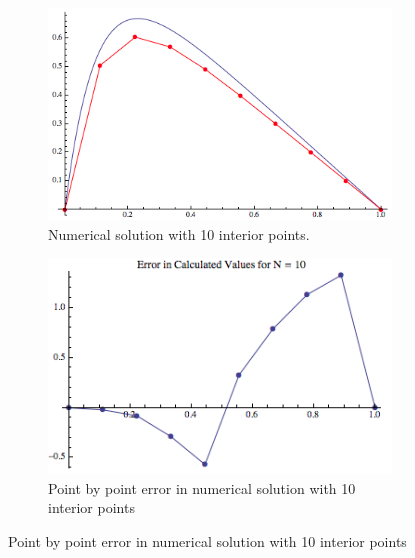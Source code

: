 \documentclass{article}
\begin{document}
\begin{figure}[H]
	\centering
	\begin{subfigure}{.5\textwidth}
  		\centering
  		\includegraphics[width=.9\linewidth]{solutionN10}
  		\caption{Numerical solution with 10 interior points. \label{fig: }}
	\end{subfigure}%
	\begin{subfigure}{.5\textwidth}
  		\centering
  		\includegraphics[width=.9\linewidth]{solutionErrorN10}
  		\caption{Point by point error in numerical solution with 10 interior points \label{fig: }}
	\end{subfigure}
\end{figure}
\end{document}
